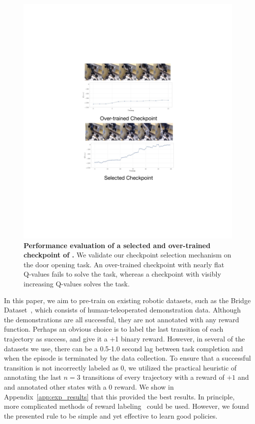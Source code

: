 \begin{figure}[h]
\centering
\vspace{-0.2cm}
  \includegraphics[width=0.6\linewidth]{chapters/ptr/fig_chkpt.pdf}
  \vspace{-0.1cm}
  \caption{\footnotesize \textbf{Performance evaluation of a selected and over-trained checkpoint of \ptrmethodname.} We validate our checkpoint selection mechanism on the door opening task. An over-trained checkpoint with nearly flat Q-values fails to solve the task, whereas a checkpoint with visibly increasing Q-values solves the task.}
  \label{fig:validation_door}
  \vspace{-0.2cm}
\end{figure}


In this paper, we aim to pre-train on existing robotic datasets, such as the Bridge Dataset~\citep{ebert2021bridge}, which consists of human-teleoperated demonstration data. Although the demonstrations are all successful, they are not annotated with any reward function. Perhaps an obvious choice is to label the last transition of each trajectory as success, and give it a +1 binary reward. However, in several of the datasets we use, there can be a 0.5-1.0 second lag between task completion and when the episode is terminated by the data collection. To ensure that a successful transition is not incorrectly labeled as $0$, we utilized the practical heuristic of annotating the last $n=3$ transitions of every trajectory with a reward of $+1$ and and annotated other states with a $0$ reward. We show in Appendix~\ref{app:exp_results} that this provided the best results. 
In principle, more complicated methods of reward labeling~\citep{eysenbach2021replacing} could be used. However, we found the presented rule to be simple and yet effective to learn good policies.

